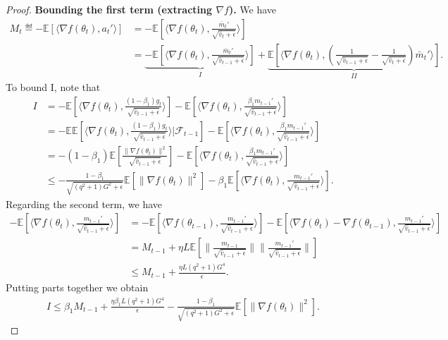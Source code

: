 \documentclass[11pt]{article}
\begin{document}
\begin{proof}
\textbf{Bounding the first term (extracting $\nabla f$).} We have
\begin{align*}
    M_t\eqdef -\mathbb E[\langle \nabla f(\theta_t), a_t'\rangle]&=-\mathbb E[\langle \nabla f(\theta_t), \frac{\bar m_t'}{\sqrt{\hat v_t+\epsilon}}\rangle]\\
    &=\underbrace{-\mathbb E[\langle \nabla f(\theta_t), \frac{\bar m_t'}{\sqrt{\hat v_{t-1}+\epsilon}} \rangle]}_{I}+\underbrace{\mathbb E[\langle \nabla f(\theta_t), (\frac{1}{\sqrt{\hat v_{t-1}+\epsilon}}-\frac{1}{\sqrt{\hat v_t+\epsilon}})\bar m_t' \rangle]}_{II}.
\end{align*}
To bound I, note that
\begin{align*}
    I&=-\mathbb E[\langle \nabla f(\theta_t), \frac{(1-\beta_1)g_t}{\sqrt{\hat v_{t-1}+\epsilon}} \rangle] -\mathbb E[\langle \nabla f(\theta_t), \frac{\beta_1 m_{t-1}'}{\sqrt{\hat v_{t-1}+\epsilon}} \rangle]\\
    &=-\mathbb E\mathbb E[\langle \nabla f(\theta_t), \frac{(1-\beta_1)g_t}{\sqrt{\hat v_{t-1}+\epsilon}} \rangle|\mathcal F_{t-1}] -\mathbb E[\langle \nabla f(\theta_t), \frac{\beta_1 m_{t-1}'}{\sqrt{\hat v_{t-1}+\epsilon}} \rangle]\\
    &=-(1-\beta_1)\mathbb E[\frac{\|\nabla f(\theta_t)\|^2}{\sqrt{\hat v_{t-1}+\epsilon}}] - \mathbb E[\langle \nabla f(\theta_t), \frac{\beta_1 m_{t-1}'}{\sqrt{\hat v_{t-1}+\epsilon}} \rangle]\\
    &\leq -\frac{1-\beta_1}{\sqrt{(q^2+1)G^2+\epsilon}}\mathbb E[\|\nabla f(\theta_t)\|^2]- \beta_1\mathbb E[\langle \nabla f(\theta_t), \frac{ m_{t-1}'}{\sqrt{\hat v_{t-1}+\epsilon}} \rangle].
\end{align*}
Regarding the second term, we have
\begin{align*}
    - \mathbb E[\langle \nabla f(\theta_t), \frac{ m_{t-1}'}{\sqrt{\hat v_{t-1}+\epsilon}} \rangle]&=-\mathbb E[\langle\nabla f(\theta_{t-1}), \frac{ m_{t-1}'}{\sqrt{\hat v_{t-1}+\epsilon}} \rangle]- \mathbb E[\langle \nabla f(\theta_t)-\nabla f(\theta_{t-1}), \frac{ m_{t-1}'}{\sqrt{\hat v_{t-1}+\epsilon}} \rangle]\\
    &=M_{t-1}+ \eta L\mathbb E[\|\frac{m_{t-1}}{\sqrt{\hat v_{t-1}+\epsilon}}\| \|\frac{m_{t-1}'}{\sqrt{\hat v_{t-1}+\epsilon}}\|]\\
    &\leq M_{t-1}+\frac{\eta L(q^2+1)G^4}{\epsilon}.
\end{align*}
Putting parts together we obtain
\begin{align*}
    I\leq \beta_1 M_{t-1}+\frac{\eta \beta_1 L(q^2+1)G^4}{\epsilon}-\frac{1-\beta_1}{\sqrt{(q^2+1)G^2+\epsilon}}\mathbb E[\|\nabla f(\theta_t)\|^2].

\end{align*}
\end{proof}
\end{document}
